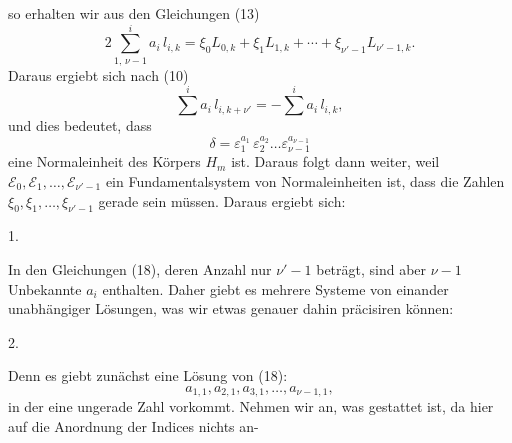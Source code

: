 
so erhalten wir aus den Gleichungen (13)
\[
2 \sum\limits_{1,\, \nu-1}^{i} a_i\, l_{i,k} = \xi_0 L_{0,k} + \xi_1 L_{1,k} + \cdots + \xi_{\nu'-1} L_{\nu'-1,k}.
\]
Daraus ergiebt sich nach (10)
\[
\sum^{i} a_i\, l_{i,k+\nu'} = -\sum^{i} a_i\, l_{i,k},
\]
und dies bedeutet, dass
\[
\delta = \varepsilon_1^{a_1}\, \varepsilon_2^{a_2} \ldots \varepsilon_{\nu-1}^{a_{\nu-1}}
\]
eine Normaleinheit des Körpers $H_m$ ist. Daraus folgt dann weiter,
weil $\mathcal{E}_0, \mathcal{E}_1, \ldots, \mathcal{E}_{\nu'-1}$ ein Fundamentalsystem von Normaleinheiten
 ist, dass die Zahlen $\xi_0, \xi_1, \ldots, \xi_{\nu'-1}$ gerade sein
müssen. Daraus ergiebt sich:

1. 

In den Gleichungen (18), deren Anzahl nur $\nu'-1$ beträgt,
sind aber $\nu-1$ Unbekannte $a_i$ enthalten. Daher giebt es mehrere
Systeme von einander unabhängiger Lösungen, was wir etwas
genauer dahin präcisiren können:

2. 

Denn es giebt zunächst eine Lösung von (18):
\[
a_{1,1}, a_{2,1}, a_{3,1}, \ldots, a_{\nu-1,1},
\]
in der eine ungerade Zahl vorkommt. Nehmen wir an, was
gestattet ist, da hier auf die Anordnung der Indices nichts an-

